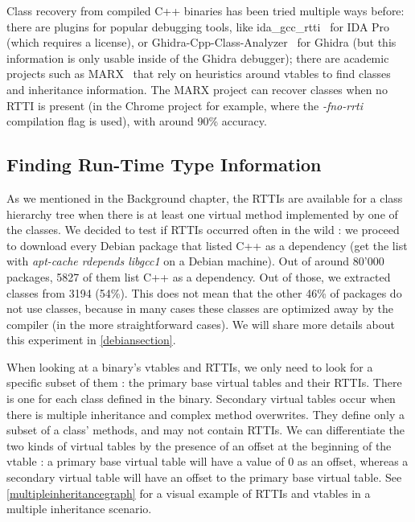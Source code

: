 \documentclass[a4paper,11pt,oneside]{report}
\begin{document}
Class recovery from compiled C++ binaries has been tried multiple ways before:
there are plugins for popular debugging tools, like 
ida\_gcc\_rtti~\cite{idagccrtti} for IDA Pro (which requires a license),
or Ghidra-Cpp-Class-Analyzer~\cite{ghidracppclassanalyzer} for Ghidra
(but this information is only usable inside of the Ghidra debugger);
there are academic projects such as MARX~\cite{marx} that rely on heuristics 
around vtables to find classes and inheritance information.
The MARX project can recover classes when no RTTI is present (in the Chrome 
project for example, where the \emph{-fno-rrti} compilation flag is used),
with around 90\% accuracy.

\subsection{Finding Run-Time Type Information}

As we mentioned in the Background chapter, the RTTIs are available for a
class hierarchy tree when there is at least one virtual method implemented
by one of the classes.
We decided to test if RTTIs occurred often in the wild : we proceed to download 
every Debian package that listed C++ as a dependency (get the list with 
\emph{apt-cache rdepends libgcc1} on a Debian machine).
Out of around 80'000 packages, 5827 of them list C++ as a dependency.
Out of those, we extracted classes from 3194 (54\%).
This does not mean that the other 46\% of packages do not use classes,
because in many cases these classes are optimized away by the compiler
(in the more straightforward cases).
We will share more details about this experiment in \autoref{debiansection}.

When looking at a binary's vtables and RTTIs, we only need to look for a
specific subset of them : the primary base virtual tables and their RTTIs.
There is one for each class defined in the binary. Secondary virtual
tables occur when there is multiple inheritance and complex method overwrites.
They define only a subset of a class' methods, and may not contain RTTIs.
We can differentiate the two kinds of virtual tables by the presence of an
offset at the beginning of the vtable : a primary base virtual table will have
a value of $0$ as an offset, whereas a secondary virtual table will have an
offset to the primary base virtual table. See
\autoref{multipleinheritancegraph} for a visual example of RTTIs and vtables
in a multiple inheritance scenario.
\end{document}
